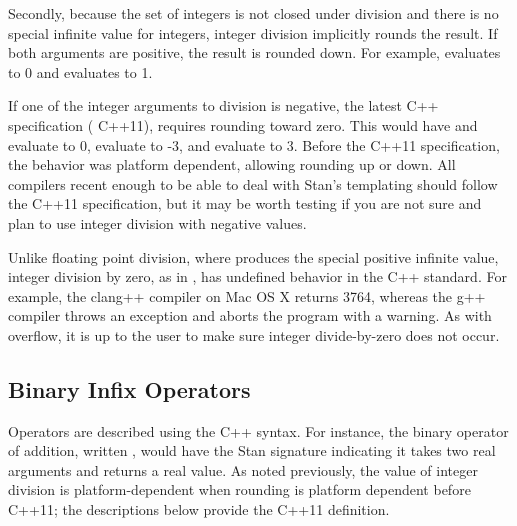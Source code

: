 Secondly, because the set of integers is not closed under division and there is no special infinite value for integers, integer division implicitly rounds the result.  If both arguments are positive, the result is rounded down.  For example,  evaluates to 0 and  evaluates to 1.


If one of the integer arguments to division is negative, the latest  C++ specification ( C++11), requires rounding toward zero.  This would have  and  evaluate to 0,  evaluate to -3, and  evaluate to 3.  Before the  C++11 specification, the behavior was platform dependent, allowing rounding up or down.  All compilers recent enough to be able to deal with Stan's templating should follow the  C++11 specification, but it may be worth testing if you are not sure and plan to use integer division with negative values.


Unlike floating point division, where  produces the special positive infinite value, integer division by zero, as in , has undefined behavior in the  C++ standard.  For example, the clang++ compiler on Mac OS X returns 3764, whereas the g++ compiler throws an exception and aborts the program with a warning.  As with overflow, it is up to the user to make sure integer divide-by-zero does not occur.


\subsection{Binary Infix Operators}


Operators are described using the  C++ syntax.  For instance, the binary operator of addition, written , would have the Stan signature  indicating it takes two real arguments and returns a real value.  As noted previously, the value of integer division is platform-dependent when rounding is platform dependent before C++11;  the descriptions below provide the C++11 definition.


